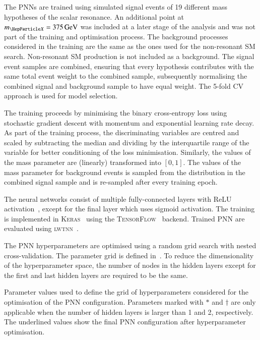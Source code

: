 The PNNs are trained using simulated signal events of 19 different
mass hypotheses of the scalar resonance. An additional point at
$\mX = \SI{375}{\GeV}$ was included at a later stage of the analysis
and was not part of the training and optimisation process. The
background processes considered in the training are the same as the
ones used for the non-resonant SM \HH search. Non-resonant SM \HH
production is not included as a background.
The signal event samples are combined, ensuring that every \mX
hypothesis contributes with the same total event weight to the
combined sample, subsequently normalising the combined signal and
background sample to have equal weight. The 5-fold CV approach is used
for model selection.

The training proceeds by minimising the binary cross-entropy loss
using stochastic gradient descent with momentum and exponential
learning rate decay. As part of the training process, the
discriminating variables are centred and scaled by subtracting the
median and dividing by the interquartile range of the variable for
better conditioning of the loss minimisation. Similarly, the values of
the mass parameter are (linearly) transformed into $[0, 1]$. The
values of the mass parameter for background events is sampled from the
\mX distribution in the combined signal sample and is re-sampled after
every training epoch.

The neural networks consist of multiple fully-connected layers with
ReLU activation~\cite{nair:relu}, except for the final layer which
uses sigmoid activation. The training is implemented in
\textsc{Keras}~\cite{keras} using the
\textsc{TensorFlow}~\cite{tensorflow2015-whitepaper} backend. Trained
PNN are evaluated using \textsc{lwtnn}~\cite{lwtnn}.

The PNN hyperparameters are optimised using a random grid search with
nested cross-validation. The parameter grid is defined
in~. To reduce the dimensionality of
the hyperparameter space, the number of nodes in the hidden layers
except for the first and last hidden layers are required to be the
same.

\begin{table}[htbp]
  \centering

  \caption{Parameter values used to define the grid of hyperparameters
    considered for the optimisation of the PNN
    configuration. Parameters marked with $*$ and $\dagger$ are only
    applicable when the number of hidden layers is larger than 1 and
    2, respectively. The underlined values show the final PNN
    configuration after hyperparameter optimisation.}%
  \label{tab:hyperparameter_grid_pnn}

  
\end{table}

